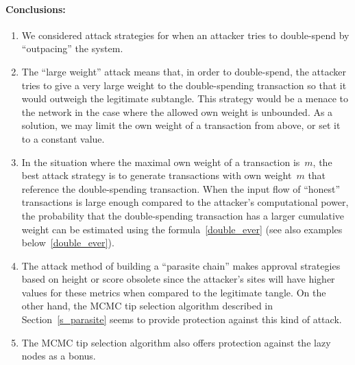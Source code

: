 \documentclass[12pt]{article}
\begin{document}
\begin{CJK}{UTF8}{bkai}
\paragraph{Conclusions:}
\begin{enumerate}
 \item We considered attack strategies for when an 
attacker tries to double-spend by ``outpacing'' the system.
 \item The ``large weight'' attack means that, in order to 
double-spend, the attacker tries to give a very large weight
to the double-spending transaction so that it would 
outweigh the legitimate subtangle. This strategy would be 
a menace to the network in the case where the allowed own weight is
unbounded. As a solution, we may limit the own weight
of a transaction from above, 
or set it to a constant value.
 \item In the situation where the maximal own weight
of a transaction is~$m$, the best attack strategy
is to generate transactions with own weight~$m$
that reference the double-spending transaction. 
When the input flow of ``honest''
transactions is large enough compared to the 
attacker's computational power, the probability
that the double-spending transaction
has a larger cumulative weight can be estimated
using the formula~\eqref{double_ever} (see also
examples below~\eqref{double_ever}).
 \item The attack method of building a ``parasite chain''
makes approval strategies based on height or score
obsolete since the attacker's sites will have higher values 
for these metrics when compared to the legitimate tangle. On the other hand,
the MCMC tip selection algorithm described in Section~\ref{s_parasite}
seems to provide protection against this kind of attack.
\item The MCMC tip selection algorithm also offers protection against 
the lazy nodes as a bonus.
\end{enumerate}




\end{CJK}
\end{document}
